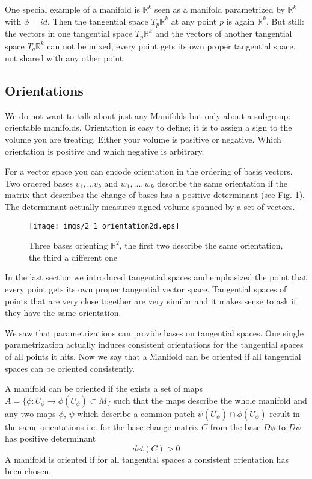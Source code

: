 One special example of a manifold is $\mathbb R^k$ seen as a manifold parametrized by $\mathbb R^k$ with $\phi = id$. Then the tangential space $T_p \mathbb R^k$ at any point $p$ is again $\mathbb R^k$. But still: the vectors in one tangential space $T_p \mathbb R^k$ and the vectors of another tangential space $T_q \mathbb R^k$ can not be mixed; every point gets its own proper tangential space, not shared with any other point.
		
\subsection{Orientations}
We do not want to talk about just any Manifolds but only about a subgroup: orientable manifolds. Orientation is easy to define; it is to assign a sign to the volume you are treating. Either your volume is positive or negative. Which orientation is positive and which negative is arbitrary. 

For a vector space you can encode orientation in the ordering of basis vectors. Two ordered bases $v_1,...v_k$ and $w_1,...,w_k$ describe the same orientation if the matrix that describes the change of bases has a positive determinant (see Fig. \ref{fig::2_1_orientation2d}). The determinant actually measures signed volume spanned by a set of vectors.

\begin{figure}[hb]
\begin{center}
\texttt{[image: imgs/2\_1\_orientation2d.eps]}
\caption{Three bases orienting $\mathbb R^2$, the first two describe the same orientation, the third a different one }
\label{fig::2_1_orientation2d}
\end{center}
\end{figure}

In the last section we introduced tangential spaces and emphasized the point that every point gets its own proper tangential vector space. Tangential spaces of points that are very close together are very similar and it makes sense to ask if they have the same orientation.


We saw that parametrizations can provide bases on tangential spaces. One single parametrization actually induces consistent orientations for the tangential spaces of all points it hits. Now we say that a Manifold can be oriented if all tangential spaces can be oriented consistently.

\begin{definition} A manifold can be oriented if the exists a set of maps $A = \{\phi: U_\phi \to \phi(U_\phi) \subset M\}$ such that the maps describe the whole manifold and any two maps $\phi$, $\psi$ which describe a common patch $\psi(U_\psi) \cap \phi(U_\phi)$ result in the same orientations i.e. for the base change matrix $C$ from the base $D\phi$ to $D\psi$ has positive determinant
\[det(C) >0\]
A manifold is oriented if for all tangential spaces a consistent orientation has been chosen.

\end{definition}


